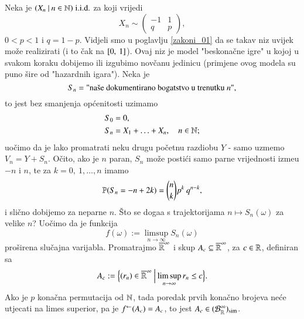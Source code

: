 \begin{pr}  \label{pr:10.3}
    Neka je $({X_n} \: | \: {n \in \mathbb{N}}) \; \mathrm{i.i.d.}$ za koji vrijedi
    \begin{equation*}
        X_n \sim
        \begin{pmatrix}
            -1 & 1\\
            q & p
        \end{pmatrix},
    \end{equation*}
    $0 < p < 1$ i $q = 1 - p$. Vidjeli smo u poglavlju \ref{zakoni_01} da se takav niz uvijek mo\v ze realizirati (i to \v cak na $[{0}, \:{1}]$).
    Ovaj niz je model "beskona\v cne igre" u kojoj u svakom koraku dobijemo ili izgubimo nov\v canu jedinicu (primjene ovog modela su puno \v sire od "hazardnih igara").
    Neka je
    \begin{equation*}
        S_n = \textnormal{"na\v se dokumentirano bogatstvo u trenutku $n$"},
    \end{equation*}
    to jest bez smanjenja op\' cenitosti uzimamo
    \begin{equation*}
        \begin{aligned}
            S_0 &= 0,\\
            S_n &= X_1 + \ldots + X_n, \quad n \in \mathbb{N};
        \end{aligned}
    \end{equation*}
    uo\v cimo da je lako promatrati neku drugu po\v cetnu razdiobu $Y$ - samo uzmemo $V_n = Y + S_n$.
    O\v cito, ako je $n$ paran, $S_n$ mo\v ze posti\' ci samo parne vrijednosti izme\dj u $-n$ i $n$, te za $k = 0, \: 1, \ldots, n$ imamo
    \begin{equation*}
        \mathbb{P}({S_n = -n + 2k}) = {n \choose k} p^k \: q^{n - k},
    \end{equation*}
    i sli\v cno dobijemo za neparne $n$.
    \v Sto se doga\dj a s trajektorijama $n \mapsto S_n(\omega)$ za velike $n$?
    Uo\v cimo da je funkcija
    \begin{equation*}
        f(\omega) := \limsup\limits_{n \to \infty} S_n(\omega)    
    \end{equation*}
    pro\v sirena slu\v cajna varijabla.
    Promatrajmo $\overline{\mathbb{R}}^{\infty}$ i skup $A_c \subseteq \overline{\mathbb{R}}^\infty$, za $c \in \mathbb{R}$, definiran sa
    \begin{equation*}
        A_c := \Big\{ {(r_n) \in \overline{\mathbb{R}}^\infty} \: \Big| \: {\limsup\limits_{n \to \infty} r_n \leq c} \Big\}.
    \end{equation*}
    Ako je $p$ kona\v cna permutacija od $\mathbb{N}$, tada poredak prvih kona\v cno brojeva ne\' ce utjecati na limes superior, pa je ${f}^{\leftarrow} (A_c) = A_c$, to jest $A_c \in (\mathcal{B}_{\mathbb{R}}^\infty)_{\mathrm{sim}}$.

\end{pr}
